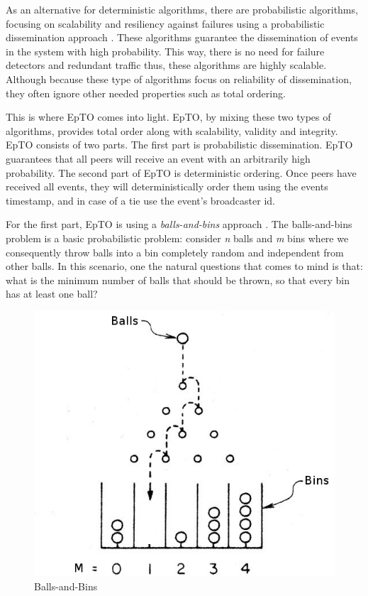 \documentclass[10pt,conference,a4paper]{IEEEtran}
\begin{document}
\par
As an alternative for deterministic algorithms, there are probabilistic algorithms, focusing on scalability and resiliency against failures using a probabilistic dissemination approach \autocites []{birman1999bimodal}[]{carvalho2007emergent}[]{demers1987epidemic}[]{eugster2003lightweight}[]{felber2002probabilistic}[]{hayden1996probabilistic}[]{kim2004gossip}[]{Koldehofe02simplegossiping}. These algorithms guarantee the dissemination of events in the system with high probability. This way, there is no need for failure detectors and redundant traffic thus, these algorithms are highly scalable. Although because these type of algorithms focus on reliability of dissemination, they often ignore other needed properties such as total ordering.
\par
This is where EpTO comes into light. EpTO, by mixing these two types of algorithms, provides total order along with scalability, validity and integrity. 
EpTO consists of two parts. The first part is probabilistic dissemination. EpTO guarantees that all peers will receive an event with an arbitrarily high probability. The second part of EpTO is deterministic ordering. Once peers have received all events, they will deterministically order them using the events timestamp, and in case of a tie use the event's broadcaster id.
\par
For the first part, EpTO is using a \textit{balls-and-bins} approach \autocite{Koldehofe02simplegossiping}. The balls-and-bins problem is a basic probabilistic problem: consider \textit{n} balls and \textit{m} bins where we consequently throw balls into a bin completely random and independent from other balls. In this scenario, one the natural questions that comes to mind is that: what is the minimum number of balls that should be thrown, so that every bin has at least one ball?
\begin{figure}
\includegraphics[width=\linewidth]{figures/BnB.jpeg}
\caption{Balls-and-Bins}
\label{fig:balls-and-bins}
\end{figure}
\end{document}
